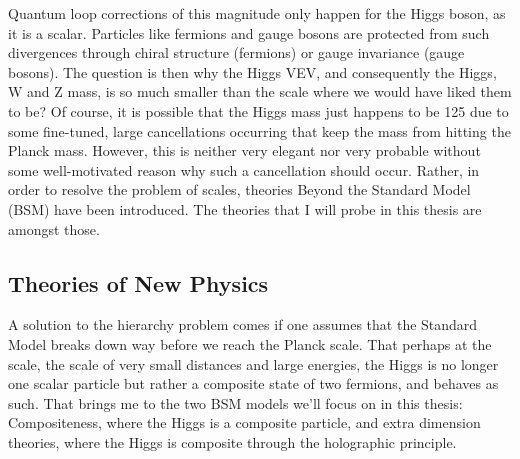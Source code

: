Quantum loop corrections of this magnitude only happen for the Higgs boson, as it is a scalar. Particles like fermions and gauge bosons are protected from such divergences through chiral structure (fermions) or gauge invariance (gauge bosons). The question is then why the Higgs VEV, and consequently the Higgs, W and Z mass, is so much smaller than the scale where we would have liked them to be?\newline
Of course, it is possible that the Higgs mass just happens to be 125 \GeV due to some fine-tuned, large cancellations occurring that keep the mass from hitting the Planck mass. However, this is neither very elegant nor very probable without some well-motivated reason why such a cancellation should occur. Rather, in order to resolve the problem of scales, theories Beyond the Standard Model (BSM) have been introduced. The theories that I will probe in this thesis are amongst those.

\subsection{Theories of New Physics}
A solution to the hierarchy problem comes if one assumes that the Standard Model breaks down way before we reach the Planck scale. That perhaps at the \TeV scale, the scale of very small distances and large energies, the Higgs is no longer one scalar particle but rather a composite state of two fermions, and behaves as such. That brings me to the two BSM models we'll focus on in this thesis: Compositeness, where the Higgs is a composite particle, and extra dimension theories, where the Higgs is composite through the holographic principle.

